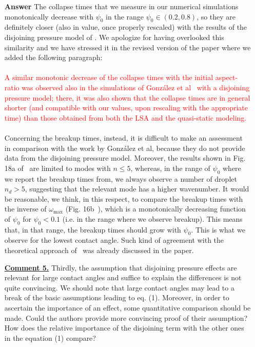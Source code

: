 \documentclass[12pt,english]{article}
\begin{document}
\begin{itemize}
\item[ \textbf{{Answer}}]
{
The collapse times that we measure in our numerical simulations monotonically decrease with $\psi_0$ in the range $\psi_0 \in (0.2,0.8)$,
so they are definitely closer (also in value, once properly rescaled) with the results of the disjoining pressure model of \cite{gonzalezStabilityLiquidRing2013}. We apologize for having overlooked this similarity and we have stressed it in the revised version of the paper where we added the following paragraph:\\
\\
\textcolor{red}{A similar monotonic decrease of the collapse times with the initial aspect-ratio was observed also in the simulations of 
Gonz\'alez et al~\cite{gonzalezStabilityLiquidRing2013} with a disjoining pressure model; there, it was also shown that the collapse times are in general shorter (and compatible with our values, upon rescaling with the appropriate time) than those obtained from both the LSA and the quasi-static modeling.}\\
\\
Concerning the breakup times, instead, it is difficult to make an assessment in comparison with the work by Gonz\'alez et al, because they do not provide data from the disjoining pressure model. Moreover, 
the results shown in Fig. 18a of~\cite{gonzalezStabilityLiquidRing2013} are limited 
to modes with $n\leq 5$, whereas, in the range of $\psi_0$ 
where we report the 
breakup times from, we always observe a number of droplet $n_d > 5$, suggesting that the relevant mode has a higher wavenumber. 
It would be reasonable, we think, in this respect, to compare the breakup times with the inverse of $\omega_{\text{max}}$ 
(Fig. 16b~\cite{gonzalezStabilityLiquidRing2013}), which is a monotonically decreasing function of $\psi_0$ for 
$\psi_0 < 0.1$ (i.e. in the range 
where we observe breakup). This means that, in that range, the breakup 
times should grow with $\psi_0$. This is what we observe for the lowest 
contact angle. Such kind of agreement with the theoretical approach 
of~\cite{gonzalezStabilityLiquidRing2013} was already discussed in the paper.
}

\item[ \textbf{\underline{Comment 5.}}]
{
Thirdly, the assumption that disjoining pressure effects are relevant for large contact angles and suffice to explain the differences is not quite convincing. 
We should note that large contact angles may lead to a break of the basic assumptions leading to eq. (1). 
Moreover, in order to ascertain the importance of an effect, some quantitative comparison should be made. 
Could the authors provide more convincing proof of their assumption? 
How does the relative importance of the disjoining term with the other ones in the equation (1) compare?
}


\end{itemize}
\end{document}
